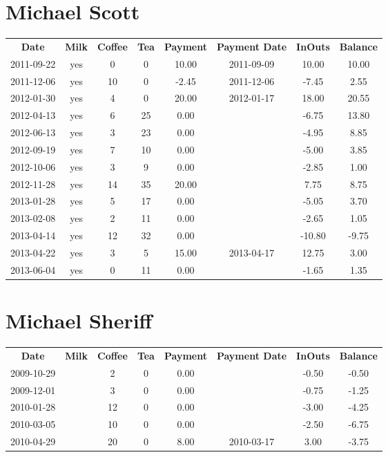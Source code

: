 \section{Michael Scott}

\begin{center}
\begin{tabular}{cccccccc}
\textbf{Date} & \textbf{Milk} & \textbf{Coffee} & \textbf{Tea} & \textbf{Payment} & \textbf{Payment Date} & \textbf{InOuts} & \textbf{Balance} \\
2011-09-22 & yes &  0 &  0 & 10.00 & 2011-09-09 &  10.00 & 10.00\\ 
2011-12-06 & yes & 10 &  0 & -2.45 & 2011-12-06 &  -7.45 &  2.55\\ 
2012-01-30 & yes &  4 &  0 & 20.00 & 2012-01-17 &  18.00 & 20.55\\ 
2012-04-13 & yes &  6 & 25 &  0.00 &  &  -6.75 & 13.80\\ 
2012-06-13 & yes &  3 & 23 &  0.00 &  &  -4.95 &  8.85\\ 
2012-09-19 & yes &  7 & 10 &  0.00 &  &  -5.00 &  3.85\\ 
2012-10-06 & yes &  3 &  9 &  0.00 &  &  -2.85 &  1.00\\ 
2012-11-28 & yes & 14 & 35 & 20.00 &  &   7.75 &  8.75\\ 
2013-01-28 & yes &  5 & 17 &  0.00 &  &  -5.05 &  3.70\\ 
2013-02-08 & yes &  2 & 11 &  0.00 &  &  -2.65 &  1.05\\ 
2013-04-14 & yes & 12 & 32 &  0.00 &  & -10.80 & -9.75\\ 
2013-04-22 & yes &  3 &  5 & 15.00 & 2013-04-17 &  12.75 &  3.00\\ 
2013-06-04 & yes &  0 & 11 &  0.00 &  &  -1.65 &  1.35
\end{tabular}
\end{center}

\section{Michael Sheriff}

\begin{center}
\begin{tabular}{cccccccc}
\textbf{Date} & \textbf{Milk} & \textbf{Coffee} & \textbf{Tea} & \textbf{Payment} & \textbf{Payment Date} & \textbf{InOuts} & \textbf{Balance} \\
2009-10-29 &  &  2 & 0 & 0.00 &  & -0.50 & -0.50\\ 
2009-12-01 &  &  3 & 0 & 0.00 &  & -0.75 & -1.25\\ 
2010-01-28 &  & 12 & 0 & 0.00 &  & -3.00 & -4.25\\ 
2010-03-05 &  & 10 & 0 & 0.00 &  & -2.50 & -6.75\\ 
2010-04-29 &  & 20 & 0 & 8.00 & 2010-03-17 &  3.00 & -3.75
\end{tabular}
\end{center}

